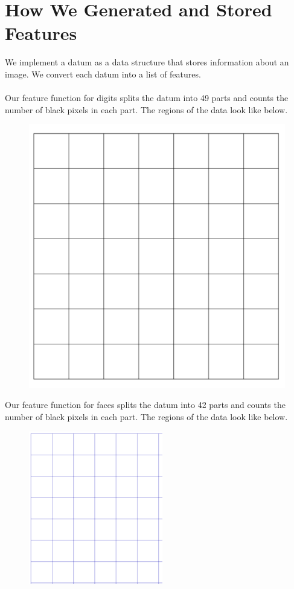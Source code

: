 \documentclass{article}
\begin{document}

\section{How We Generated and Stored Features}

We implement a datum as a data structure that stores information about an image. We convert each datum into a list of features. \\\\
Our feature function for digits splits the datum into 49 parts and counts the number of black pixels in each part. The regions of the data look like below.\\
\begin{figure}[H]
  	\includegraphics[scale=.3]{7x7.png}
\end{figure}
Our feature function for faces splits the datum into 42 parts and counts the number of black pixels in each part. The regions of the data look like below.\\
\begin{figure}[H]
  	\includegraphics[scale=.6]{6x7.png}
\end{figure}
\end{document}
